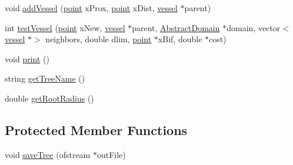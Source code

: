 \begin{DoxyCompactItemize}
\item 
void \mbox{\hyperlink{class_fi_ra_ro_va_vi_opt_c_c_o_tree_aca2ace9e5f772754cd1c975cc8431c95}{add\+Vessel}} (\mbox{\hyperlink{structpoint}{point}} x\+Prox, \mbox{\hyperlink{structpoint}{point}} x\+Dist, \mbox{\hyperlink{structvessel}{vessel}} $\ast$parent)
\item 
int \mbox{\hyperlink{class_fi_ra_ro_va_vi_opt_c_c_o_tree_a270d5cd761d5fdad6a260aebd8869e6e}{test\+Vessel}} (\mbox{\hyperlink{structpoint}{point}} x\+New, \mbox{\hyperlink{structvessel}{vessel}} $\ast$parent, \mbox{\hyperlink{class_abstract_domain}{Abstract\+Domain}} $\ast$domain, vector$<$ \mbox{\hyperlink{structvessel}{vessel}} $\ast$$>$ neighbors, double dlim, \mbox{\hyperlink{structpoint}{point}} $\ast$x\+Bif, double $\ast$cost)
\item 
void \mbox{\hyperlink{class_fi_ra_ro_va_vi_opt_c_c_o_tree_adf72b1a9082866623330c40b57ae97f7}{print}} ()
\item 
string \mbox{\hyperlink{class_fi_ra_ro_va_vi_opt_c_c_o_tree_ab9e0556084e74d15d63900dd2f51059e}{get\+Tree\+Name}} ()
\item 
double \mbox{\hyperlink{class_fi_ra_ro_va_vi_opt_c_c_o_tree_aa361b74c3a3bcd6abafd101755ceffc7}{get\+Root\+Radius}} ()
\end{DoxyCompactItemize}
\subsection*{Protected Member Functions}
\begin{DoxyCompactItemize}
\item 
void \mbox{\hyperlink{class_fi_ra_ro_va_vi_opt_c_c_o_tree_ae711117b173cbb92acd296ff4973f560}{save\+Tree}} (ofstream $\ast$out\+File)
\end{DoxyCompactItemize}
